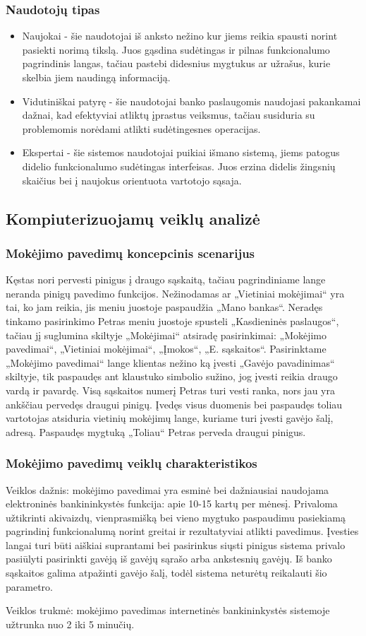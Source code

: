 \documentclass{VUMIFPSkursinis}
\begin{document}
\subsubsection{Naudotojų tipas}
\begin{itemize}
	\item Naujokai - šie naudotojai iš anksto nežino kur jiems reikia spausti norint pasiekti norimą tikslą. Juos gąsdina sudėtingas ir pilnas funkcionalumo pagrindinis langas, tačiau pastebi didesnius mygtukus ar užrašus, kurie skelbia jiem naudingą informaciją.
	\item Vidutiniškai patyrę - šie naudotojai banko paslaugomis naudojasi pakankamai dažnai, kad efektyviai atliktų įprastus veiksmus, tačiau susiduria su problemomis norėdami atlikti sudėtingesnes operacijas.
	\item Ekspertai - šie sistemos naudotojai puikiai išmano sistemą, jiems patogus didelio funkcionalumo sudėtingas interfeisas. Juos erzina didelis žingsnių skaičius bei į naujokus orientuota vartotojo sąsaja.
\end{itemize}
\subsection{Kompiuterizuojamų veiklų analizė}
\subsubsection{Mokėjimo pavedimų koncepcinis scenarijus}
Kęstas nori pervesti pinigus į draugo sąskaitą, tačiau pagrindiniame lange neranda pinigų pavedimo funkcijos. Nežinodamas ar „Vietiniai mokėjimai“ yra tai, ko jam reikia, jis meniu juostoje paspaudžia „Mano bankas“. Neradęs tinkamo pasirinkimo Petras meniu juostoje spusteli „Kasdieninės paslaugos“, tačiau jį suglumina skiltyje „Mokėjimai“ atsiradę pasirinkimai: „Mokėjimo pavedimai“, „Vietiniai mokėjimai“, „Įmokos“, „E. sąskaitos“. Pasirinktame „Mokėjimo pavedimai“ lange klientas nežino ką įvesti „Gavėjo pavadinimas“ skiltyje, tik paspaudęs ant klaustuko simbolio sužino, jog įvesti reikia draugo vardą ir pavardę. Visą sąskaitos numerį Petras turi vesti ranka, nors jau yra ankščiau pervedęs draugui pinigų. Įvedęs visus duomenis bei paspaudęs toliau vartotojas atsiduria vietinių mokėjimų lange, kuriame turi įvesti gavėjo šalį, adresą. Paspaudęs mygtuką „Toliau“ Petras perveda draugui pinigus.
\subsubsection{Mokėjimo pavedimų veiklų charakteristikos}
Veiklos dažnis: mokėjimo pavedimai yra esminė bei dažniausiai naudojama elektroninės bankininkystės funkcija: apie 10-15 kartų per mėnesį. Privaloma užtikrinti akivaizdų, vienprasmišką bei vieno mygtuko paspaudimu pasiekiamą pagrindinį funkcionalumą norint greitai ir rezultatyviai atlikti pavedimus. Įvesties langai turi būti aiškiai suprantami bei pasirinkus siųsti pinigus sistema privalo pasiūlyti pasirinkti gavėją iš gavėjų sąrašo arba ankstesnių gavėjų. Iš banko sąskaitos galima atpažinti gavėjo šalį, todėl sistema neturėtų reikalauti šio parametro. \par 
Veiklos trukmė: mokėjimo pavedimas internetinės bankininkystės sistemoje užtrunka nuo 2 iki 5 minučių.
\end{document}
